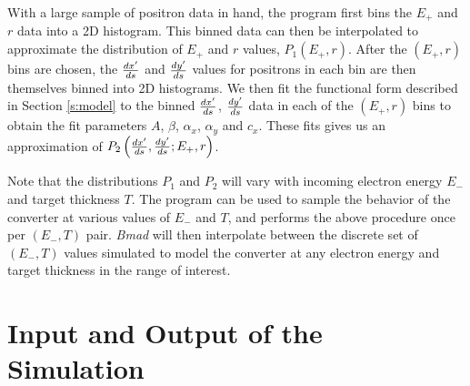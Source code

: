 \documentclass[12pt]{article}
\begin{document}
With a large sample of positron data in hand, the program first bins the $E_+$ and $r$ data into a 2D histogram.
This binned data can then be interpolated to approximate the distribution of $E_+$ and $r$ values, $P_1(E_+, r)$.
After the $(E_+, r)$ bins are chosen, the $\frac{dx'}{ds}$ and $\frac{dy'}{ds}$ values for positrons in each bin are then themselves binned into 2D histograms.
We then fit the functional form described in Section \ref{s:model} to the binned $\frac{dx'}{ds}$, $\frac{dy'}{ds}$ data in each of the $(E_+, r)$ bins to obtain the fit parameters $A$, $\beta$, $\alpha_x$, $\alpha_y$ and $c_x$.
These fits gives us an approximation of $P_2 \left( \frac{dx'}{ds}, \frac{dy'}{ds} ; E_+, r \right)$.

Note that the distributions $P_1$ and $P_2$ will vary with incoming electron energy $E_-$ and target thickness $T$.
The program can be used to sample the behavior of the converter at various values of $E_-$ and $T$, and performs the above procedure once per $(E_-, T)$ pair.
\textit{Bmad} will then interpolate between the discrete set of $(E_-, T)$ values simulated to model the converter at any electron energy and target thickness in the range of interest.


\section{Input and Output of the Simulation}
\label{s:output}
\end{document}
